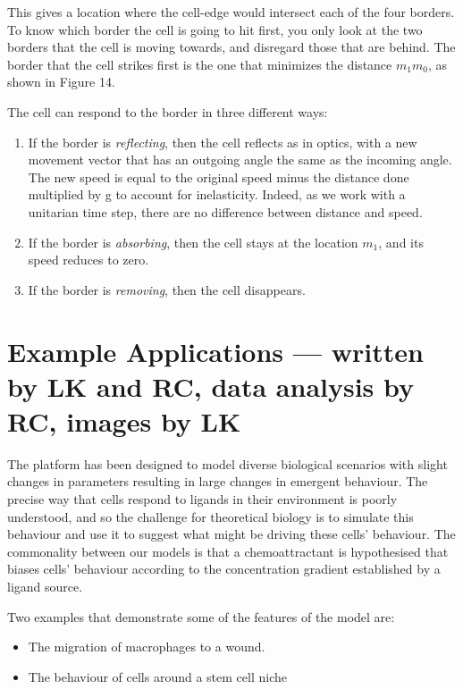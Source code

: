 \documentclass[12pt]{article}
\begin{document}
This gives a location where the cell-edge would intersect each of the
four borders. To know which border the cell is going to hit 
first, you only look at the two borders that the cell is moving towards, 
and disregard those that are behind. The border that the cell strikes 
first is the one that minimizes the distance \(m_1m_0\), as 
shown in Figure 14. 

The cell can respond to the border in three different ways: 

\begin{enumerate}
  \item If the border is {\itshape reflecting}, then the cell reflects as in optics, 
with a new movement vector that has an outgoing angle the same as the 
incoming angle. The new speed is equal to the original speed minus the distance done
multiplied by g to account for inelasticity. Indeed, as we work with a unitarian time step, 
there are no difference between distance and speed. 
\item If the border is {\itshape absorbing}, then the cell stays at the location \(m_1\), 
  and its speed reduces to zero.
\item If the border is {\itshape removing}, then the cell disappears.
\end{enumerate}

\section{Example Applications --- written by LK and RC, data analysis by RC, images by LK}
The platform has been designed to model diverse biological scenarios with 
slight changes in parameters resulting in large changes in emergent 
behaviour. The precise way that cells respond to ligands in their environment is poorly
understood, \cite{cai} and so the challenge for theoretical biology is to simulate 
this behaviour and use it to suggest what might be driving these cells' behaviour.
The commonality between our models is that a 
chemoattractant is hypothesised that biases cells' behaviour according 
to the concentration gradient established by a ligand source.

Two examples that demonstrate some of the features of the model are:

\begin{itemize}
\item The migration of macrophages to a wound.
\item The behaviour of cells around a stem cell niche
\end{itemize}
\end{document}
